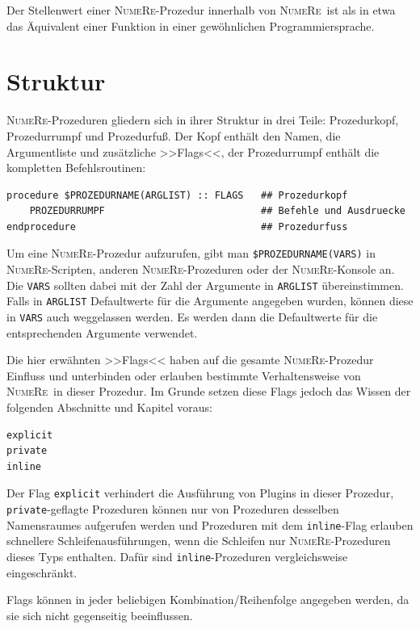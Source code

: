 \documentclass[DIV=14,headsepline,footsepline]{scrbook}
\newcommand{\NR}{\textsc{Nu\-me\-Re}}
\begin{document}
				Der Stellenwert einer \NR-Prozedur innerhalb von \NR\ ist als in etwa das Äquivalent einer Funktion in einer gewöhnlichen Programmiersprache.
				
			\section{Struktur}
				\NR-Prozeduren gliedern sich in ihrer Struktur in drei Teile: Prozedurkopf, Prozedurrumpf und Prozedurfuß. Der Kopf enthält den Namen, die Argumentliste und zusätzliche >>Flags<<, der Prozedurrumpf enthält die kompletten Befehlsroutinen:
				\begin{lstlisting}
procedure $PROZEDURNAME(ARGLIST) :: FLAGS   ## Prozedurkopf
	PROZEDURRUMPF                           ## Befehle und Ausdruecke
endprocedure                                ## Prozedurfuss
				\end{lstlisting}
				Um eine \NR-Prozedur aufzurufen, gibt man \verb+$PROZEDURNAME(VARS)+ in \NR-Scrip\-ten, anderen \NR-Prozeduren oder der \NR-Konsole an. Die \verb+VARS+ sollten dabei mit der Zahl der Argumente in \verb+ARGLIST+ übereinstimmen. Falls in \verb+ARGLIST+ Defaultwerte für die Argumente angegeben wurden, können diese in \verb+VARS+ auch weggelassen werden. Es werden dann die Defaultwerte für die entsprechenden Argumente verwendet.
				
				Die hier erwähnten >>Flags<< haben auf die gesamte \NR-Prozedur Einfluss und unterbinden oder erlauben bestimmte Verhaltensweise von \NR\ in dieser Prozedur. Im Grunde setzen diese Flags jedoch das Wissen der folgenden Abschnitte und Kapitel voraus:
				\begin{lstlisting}
explicit
private
inline
				\end{lstlisting}
				Der Flag \verb+explicit+ verhindert die Ausführung von Plugins in dieser Prozedur, \verb+private+-geflagte Prozeduren können nur von Prozeduren desselben Namensraumes aufgerufen werden und Prozeduren mit dem \verb+inline+-Flag erlauben schnellere Schleifenausführungen, wenn die Schleifen nur \NR-Pro\-ze\-du\-ren dieses Typs enthalten. Dafür sind \verb+inline+-Pro\-ze\-du\-ren vergleichsweise eingeschränkt.
				
				Flags können in jeder beliebigen Kombination/Reihenfolge angegeben werden, da sie sich nicht gegenseitig beeinflussen.
				
\end{document}
